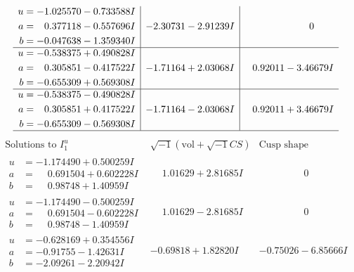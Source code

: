 \documentclass[1p]{elsarticle_modified}
\theoremstyle{definition}
\newcommand{\I}{\sqrt{-1}}
\begin{document}
$$\begin{array}{c|c|c}
\begin{aligned}
u &= -1.025570 - 0.733588 I \\
a &= \phantom{-}0.377118 - 0.557696 I \\
b &= -0.047638 - 1.359340 I\end{aligned}
 & -2.30731 - 2.91239 I & \phantom{-0.000000 } 0 \\ \hline\begin{aligned}
u &= -0.538375 + 0.490828 I \\
a &= \phantom{-}0.305851 - 0.417522 I \\
b &= -0.655309 + 0.569308 I\end{aligned}
 & -1.71164 + 2.03068 I & \phantom{-}0.92011 - 3.46679 I \\ \hline\begin{aligned}
u &= -0.538375 - 0.490828 I \\
a &= \phantom{-}0.305851 + 0.417522 I \\
b &= -0.655309 - 0.569308 I\end{aligned}
 & -1.71164 - 2.03068 I & \phantom{-}0.92011 + 3.46679 I\\
 \hline 
 \end{array}$$\newpage$$\begin{array}{c|c|c}  
\text{Solutions to }I^u_{1}& \I (\text{vol} + \sqrt{-1}CS) & \text{Cusp shape}\\
 \hline 
\begin{aligned}
u &= -1.174490 + 0.500259 I \\
a &= \phantom{-}0.691504 + 0.602228 I \\
b &= \phantom{-}0.98748 + 1.40959 I\end{aligned}
 & \phantom{-}1.01629 + 2.81685 I & \phantom{-0.000000 } 0 \\ \hline\begin{aligned}
u &= -1.174490 - 0.500259 I \\
a &= \phantom{-}0.691504 - 0.602228 I \\
b &= \phantom{-}0.98748 - 1.40959 I\end{aligned}
 & \phantom{-}1.01629 - 2.81685 I & \phantom{-0.000000 } 0 \\ \hline\begin{aligned}
u &= -0.628169 + 0.354556 I \\
a &= -0.91755 - 1.42631 I \\
b &= -2.09261 - 2.20942 I\end{aligned}
 & -0.69818 + 1.82820 I & -0.75026 - 6.85666 I \\ \hline\begin{aligned}

\end{aligned}
\end{array}$$
\end{document}
